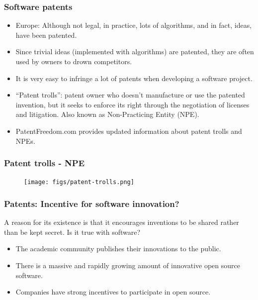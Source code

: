 \begin{frame}
\frametitle{Software patents}

\begin{itemize}
\item Europe: Although not legal, in
  practice, lots of algorithms, and in fact, ideas, have been
  patented.
\item Since trivial ideas (implemented with algorithms) are patented,
  they are often used by owners to drown competitors.
\item It is very easy to infringe a lot of patents when developing a software project.
\item ``\alert{Patent trolls}'': patent owner who doesn't manufacture or use the patented invention, but it seeks to enforce its right through the negotiation of licenses and litigation.
Also known as \alert{Non-Practicing Entity} (NPE).
\item PatentFreedom.com provides updated information about patent trolls and NPEs.
\end{itemize}

\end{frame}


\begin{frame}
\frametitle{Patent trolls - NPE}

\begin{figure}
 \vspace{-0.3cm}
\begin{center}
	\texttt{[image: figs/patent-trolls.png]}
\end{center}
\end{figure}

\end{frame}


\begin{frame}
\frametitle{Patents: Incentive for software innovation?}

A reason for its existence is that it encourages inventions to be shared rather than be kept secret. Is it true with software?

\pause

\begin{itemize}
\item The academic community publishes their innovations to the public.
\item There is a massive and rapidly growing amount of innovative open source software.
\item Companies have strong incentives to participate in open source.
\end{itemize}

\end{frame}


